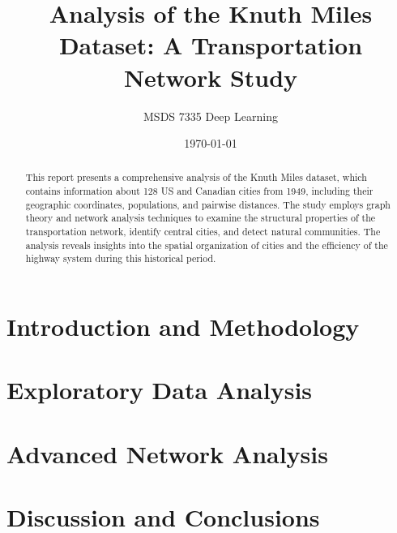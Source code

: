 \documentclass[12pt]{report}
\title{Analysis of the Knuth Miles Dataset: A Transportation Network Study}
\author{MSDS 7335 Deep Learning}
\date{\today}
\begin{document}
\maketitle

\begin{abstract}
This report presents a comprehensive analysis of the Knuth Miles dataset, which contains information about 128 US and Canadian cities from 1949, including their geographic coordinates, populations, and pairwise distances. The study employs graph theory and network analysis techniques to examine the structural properties of the transportation network, identify central cities, and detect natural communities. The analysis reveals insights into the spatial organization of cities and the efficiency of the highway system during this historical period.
\end{abstract}

\tableofcontents
\listoffigures
\listoftables

\chapter{Introduction and Methodology}


\chapter{Exploratory Data Analysis}


\chapter{Advanced Network Analysis}


\chapter{Discussion and Conclusions}




\end{document}
